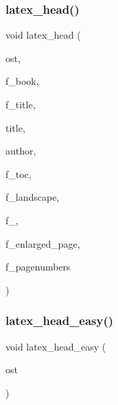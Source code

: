 \subsubsection{\texorpdfstring{latex\+\_\+head()}{latex\_head()}}
{\footnotesize\ttfamily void latex\+\_\+head (\begin{DoxyParamCaption}\item[{ostream \&}]{ost,  }\item[{\mbox{\hyperlink{galois_8h_a09fddde158a3a20bd2dcadb609de11dc}{I\+NT}}}]{f\+\_\+book,  }\item[{\mbox{\hyperlink{galois_8h_a09fddde158a3a20bd2dcadb609de11dc}{I\+NT}}}]{f\+\_\+title,  }\item[{const \mbox{\hyperlink{galois_8h_ab6cc7b4aeb6ea31aba2b3fbfc83ff5e6}{B\+Y\+TE}} $\ast$}]{title,  }\item[{const \mbox{\hyperlink{galois_8h_ab6cc7b4aeb6ea31aba2b3fbfc83ff5e6}{B\+Y\+TE}} $\ast$}]{author,  }\item[{\mbox{\hyperlink{galois_8h_a09fddde158a3a20bd2dcadb609de11dc}{I\+NT}}}]{f\+\_\+toc,  }\item[{\mbox{\hyperlink{galois_8h_a09fddde158a3a20bd2dcadb609de11dc}{I\+NT}}}]{f\+\_\+landscape,  }\item[{\mbox{\hyperlink{galois_8h_a09fddde158a3a20bd2dcadb609de11dc}{I\+NT}}}]{f\+\_\+12pt,  }\item[{\mbox{\hyperlink{galois_8h_a09fddde158a3a20bd2dcadb609de11dc}{I\+NT}}}]{f\+\_\+enlarged\+\_\+page,  }\item[{\mbox{\hyperlink{galois_8h_a09fddde158a3a20bd2dcadb609de11dc}{I\+NT}}}]{f\+\_\+pagenumbers }\end{DoxyParamCaption})}

\mbox{\label{util_8_c_af113b244ad72251e782a33c429b6fd12}} 
\subsubsection{\texorpdfstring{latex\+\_\+head\+\_\+easy()}{latex\_head\_easy()}}
{\footnotesize\ttfamily void latex\+\_\+head\+\_\+easy (\begin{DoxyParamCaption}\item[{ostream \&}]{ost }\end{DoxyParamCaption})}

\mbox{\label{util_8_c_a4b10b4e3009dca099a0f486ccb76eb82}} 
